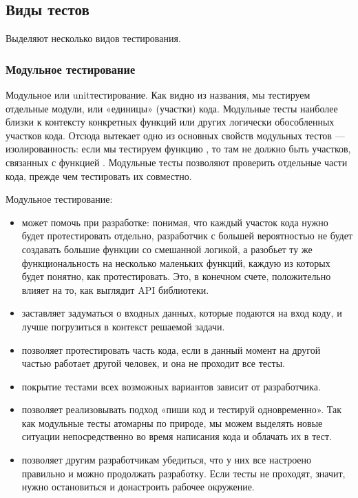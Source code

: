 \documentclass[letterpaper,10pt,russian]{sphinxmanual}
\begin{document}
\subsection{Виды тестов}
\label{\detokenize{educational_materials/testing/content:id3}}
\sphinxAtStartPar
Выделяют несколько видов тестирования.


\subsubsection{Модульное тестирование}
\label{\detokenize{educational_materials/testing/content:id4}}
\sphinxAtStartPar
Модульное или unit\sphinxhyphen{}тестирование. Как видно из названия, мы тестируем отдельные модули, или «единицы» (участки) кода. Модульные тесты наиболее близки к контексту конкретных функций или других логически обособленных участков кода. Отсюда вытекает одно из основных свойств модульных тестов — изолированность: если мы тестируем функцию , то там не должно быть участков, связанных с функцией . Модульные тесты позволяют проверить отдельные части кода, прежде чем тестировать их совместно.

\sphinxAtStartPar
{}

\sphinxAtStartPar
Модульное тестирование:
\begin{itemize}
\item {} 
\sphinxAtStartPar
может помочь при разработке: понимая, что каждый участок кода нужно будет протестировать отдельно, разработчик с большей вероятностью не будет создавать большие функции со смешанной логикой, а разобьет ту же функциональность на несколько маленьких функций, каждую из которых будет понятно, как протестировать. Это, в конечном счете, положительно влияет на то, как выглядит API библиотеки.

\item {} 
\sphinxAtStartPar
заставляет задуматься о входных данных, которые подаются на вход коду, и лучше погрузиться в контекст решаемой задачи.

\item {} 
\sphinxAtStartPar
позволяет протестировать часть кода, если в данный момент на другой частью работает другой человек, и она не проходит все тесты.

\item {} 
\sphinxAtStartPar
покрытие тестами всех возможных вариантов зависит от разработчика.

\item {} 
\sphinxAtStartPar
позволяет реализовывать подход «пиши код и тестируй одновременно». Так как модульные тесты атомарны по природе, мы можем выделять новые ситуации непосредственно во время написания кода и облачать их в тест.

\item {} 
\sphinxAtStartPar
позволяет другим разработчикам убедиться, что у них все настроено правильно и можно продолжать разработку. Если тесты не проходят, значит, нужно остановиться и донастроить рабочее окружение.

\end{itemize}
\end{document}
